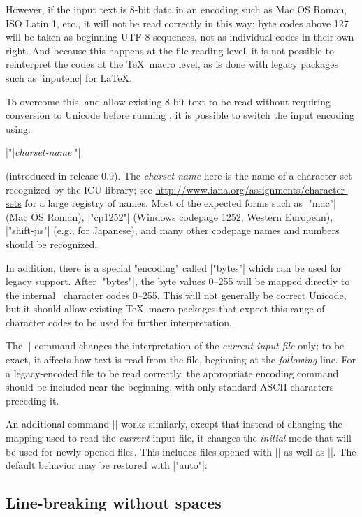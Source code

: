 However, if the input text is 8-bit data in an encoding such as Mac OS Roman, ISO Latin 1, etc., it will not be read correctly in this way; byte codes above 127 will be taken as beginning UTF-8 sequences, not as individual codes in their own right. And because this happens at the file-reading level, it is not possible to reinterpret the codes at the \TeX\ macro level, as is done with legacy packages such as |inputenc| for \LaTeX.

\CMDI{\XeteXinputencoding}

To overcome this, and allow existing 8-bit text to be read without requiring conversion to Unicode before running \XeTeX, it is possible to switch the input encoding using:
{\obeylines \parskip0pt \parindent
  |\XeTeXinputencoding "|{\em charset-name}|"|\par}\noindent
(introduced in release 0.9). The {\em charset-name} here is the name of a character set recognized by the ICU library; see \url{http://www.iana.org/assignments/character-sets} for a large registry of names. Most of the expected forms such as |"mac"| (Mac OS Roman), |"cp1252"| (Windows codepage 1252, Western European), |"shift-jis"| (e.g., for Japanese), and many other codepage names and numbers should be recognized.

In addition, there is a special "encoding" called |"bytes"| which can be used for legacy support. After |\XeTeXinputencoding "bytes"|, the byte values 0–255 will be mapped directly to the internal \XeTeX\ character codes 0–255. This will not generally be correct Unicode, but it should allow existing \TeX\ macro packages that expect this range of character codes to be used for further interpretation.

The |\XeTeXinputencoding| command changes the interpretation of the {\em current input file} only; to be exact, it affects how text is read from the file, beginning at the {\em following} line. For a legacy-encoded file to be read correctly, the appropriate encoding command should be included near the beginning, with only standard ASCII characters preceding it.

An additional command |\XeTeXdefaultencoding| works similarly, except that instead of changing the mapping used to read the {\em current} input file, it changes the {\em initial} mode that will be used for newly-opened files. This includes files opened with |\openin| as well as ||. The default behavior may be restored with |\XeTeXdefaultencoding "auto"|.

\subsection{Line-breaking without spaces}

